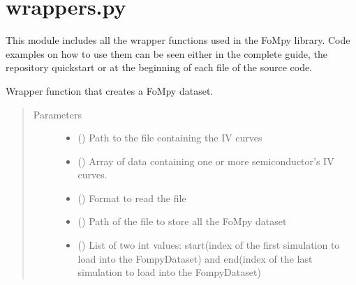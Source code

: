 \documentclass[letterpaper,10pt,english,openany, oneside]{sphinxmanual}
\begin{document}
\label{\detokenize{index:module-fompy.wrappers}}

\section{wrappers.py}
\label{\detokenize{index:wrappers-py}}
This module includes all the wrapper functions used in the FoMpy library.
Code examples on how to use them can be seen either in the complete guide, the repository quickstart
or at the beginning of each file of the source code.

\begin{fulllineitems}
\label{\detokenize{index:fompy.wrappers.dataset}}
Wrapper function that creates a FoMpy dataset.
\begin{quote}\begin{description}
\item[{Parameters}] \leavevmode\begin{itemize}
\item {} 
 () \textendash{} Path to the file containing the IV curves

\item {} 
 () \textendash{} Array of data containing one or more semiconductor’s IV curves.

\item {} 
 () \textendash{} Format to read the file

\item {} 
 () \textendash{} Path of the file to store all the FoMpy dataset

\item {} 
 () \textendash{} List of two int values: start(index of the first simulation to load into the FompyDataset)
and end(index of the last simulation to load into the FompyDataset)


\end{itemize}
\end{description}
\end{quote}
\end{fulllineitems}
\end{document}
